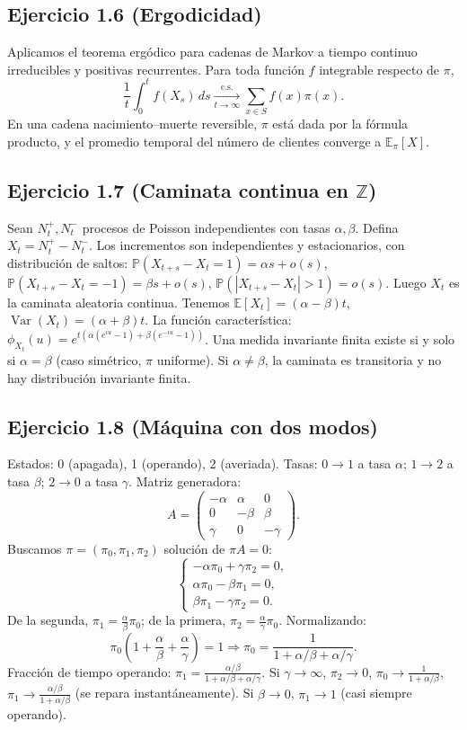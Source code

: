\documentclass[letterpaper, 12pt]{article}
\newcommand{\E}{\mathbb{E}}
\renewcommand{\P}{\mathbb{P}}
\newcommand{\Z}{\mathbb{Z}}
\newcommand{\1}{\mathbbm{1}}
\DeclareMathOperator{\Var}{Var}
\begin{document}
    \subsection{Ejercicio 1.6 (Ergodicidad)}
    Aplicamos el teorema erg\'odico para cadenas de Markov a tiempo continuo irreducibles y positivas recurrentes. Para toda funci\'on $f$ integrable respecto de $\pi$,
    \[
    \frac1t\int_0^t f(X_s)\,ds\xrightarrow[t\to\infty]{\text{c.s.}}\sum_{x\in S}f(x)\pi(x).
    \]
    En una cadena nacimiento--muerte reversible, $\pi$ est\'a dada por la f\'ormula producto, y el promedio temporal del n\'umero de clientes converge a $\E_\pi[X]$.

    \subsection{Ejercicio 1.7 (Caminata continua en $\Z$)}
    Sean $N^+_t,N^-_t$ procesos de Poisson independientes con tasas $\alpha,\beta$. Defina $X_t=N^+_t-N^-_t$. Los incrementos son independientes y estacionarios, con distribuci\'on de saltos: $\P(X_{t+s}-X_t=1)=\alpha s+o(s)$, $\P(X_{t+s}-X_t=-1)=\beta s+o(s)$, $\P(|X_{t+s}-X_t|>1)=o(s)$. Luego $X_t$ es la caminata aleatoria continua. Tenemos $\E[X_t]=(\alpha-\beta)t$, $\Var(X_t)=(\alpha+\beta)t$. La funci\'on caracter\'istica: $\phi_{X_t}(u)=e^{t(\alpha(e^{iu}-1)+\beta(e^{-iu}-1))}$. Una medida invariante finita existe si y solo si $\alpha=\beta$ (caso sim\'etrico, $\pi$ uniforme). Si $\alpha\neq\beta$, la caminata es transitoria y no hay distribuci\'on invariante finita.

    \subsection{Ejercicio 1.8 (M\'aquina con dos modos)}
    Estados: 0 (apagada), 1 (operando), 2 (averiada). Tasas: $0\to1$ a tasa $\alpha$; $1\to2$ a tasa $\beta$; $2\to0$ a tasa $\gamma$. Matriz generadora:
    \[
    A=\begin{pmatrix}
    -\alpha & \alpha & 0\\
    0 & -\beta & \beta\\
    \gamma & 0 & -\gamma
    \end{pmatrix}.
    \]
    Buscamos $\pi=(\pi_0,\pi_1,\pi_2)$ soluci\'on de $\pi A=0$:
    \[
    \begin{cases}
    -\alpha\pi_0+\gamma\pi_2=0,\\
    \alpha\pi_0-\beta\pi_1=0,\\
    \beta\pi_1-\gamma\pi_2=0.
    \end{cases}
    \]
    De la segunda, $\pi_1=\frac{\alpha}{\beta}\pi_0$; de la primera, $\pi_2=\frac{\alpha}{\gamma}\pi_0$. Normalizando:
    \[
    \pi_0\left(1+\frac{\alpha}{\beta}+\frac{\alpha}{\gamma}\right)=1\Rightarrow \pi_0=\frac{1}{1+\alpha/\beta+\alpha/\gamma}.
    \]
    Fracci\'on de tiempo operando: $\pi_1=\frac{\alpha/\beta}{1+\alpha/\beta+\alpha/\gamma}$. Si $\gamma\to\infty$, $\pi_2\to0$, $\pi_0\to\frac{1}{1+\alpha/\beta}$, $\pi_1\to\frac{\alpha/\beta}{1+\alpha/\beta}$ (se repara instant\'aneamente). Si $\beta\to0$, $\pi_1\to1$ (casi siempre operando).
\end{document}
